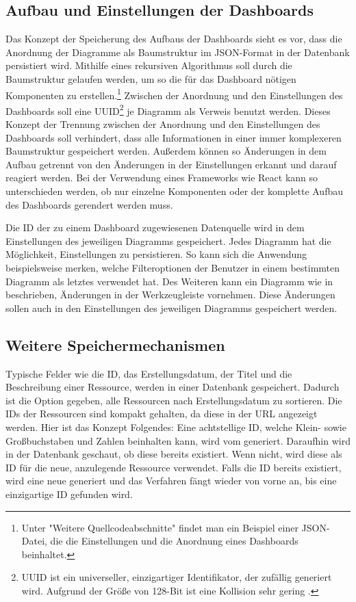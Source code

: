 \subsection{Aufbau und Einstellungen der Dashboards}
\label{subsec:aufbauundeinstellungenderdashboards}
Das Konzept der Speicherung des Aufbaus der Dashboards sieht es vor, dass die Anordnung 
der Diagramme als Baumstruktur im JSON-Format in der Datenbank persistiert wird. Mithilfe eines
rekursiven Algorithmus soll durch die Baumstruktur gelaufen werden, um so die für das Dashboard
nötigen Komponenten zu erstellen.\footnote{Unter "Weitere Quellcodeabschnitte" findet man ein Beispiel
einer JSON-Datei, die die Einstellungen und die Anordnung eines Dashboards beinhaltet.}
Zwischen der Anordnung und den Einstellungen des Dashboards soll eine UUID\footnote{UUID ist ein universeller,
einzigartiger Identifikator, der zufällig generiert wird. Aufgrund der Größe
von 128-Bit ist eine Kollision sehr gering \cite{UUIDJavaSEDocs}.} 
je Diagramm als Verweis benutzt werden. Dieses Konzept der Trennung zwischen
der Anordnung und den Einstellungen des Dashboards soll verhindert, dass
alle Informationen in einer immer komplexeren Baumstruktur gespeichert werden.
Außerdem können so Änderungen in dem Aufbau getrennt von den Änderungen in der
Einstellungen erkannt und darauf reagiert werden. Bei der Verwendung eines
Frameworks wie React kann so unterschieden werden, ob nur einzelne Komponenten
oder der komplette Aufbau des Dashboards gerendert werden muss.

Die ID der zu einem Dashboard zugewiesenen Datenquelle wird in dem Einstellungen
des jeweiligen Diagramms gespeichert. Jedes Diagramm hat die Möglichkeit,
Einstellungen zu persistieren. So kann sich die Anwendung beispielsweise merken,
welche Filteroptionen der Benutzer in einem bestimmten Diagramm als letztes verwendet
hat. Des Weiteren kann ein Diagramm wie in  beschrieben,
Änderungen in der Werkzeugleiste vornehmen. Diese Änderungen
sollen auch in den Einstellungen des jeweiligen Diagramms gespeichert werden.

\subsection{Weitere Speichermechanismen}
\label{subsec:weiterespeichermechanismen}
Typische Felder wie die ID, das Erstellungsdatum, der Titel und die Beschreibung einer Ressource,
werden in einer Datenbank gespeichert. Dadurch ist die Option gegeben, alle
Ressourcen nach Erstellungsdatum zu sortieren. Die IDs der Ressourcen sind kompakt gehalten,
da diese in der URL angezeigt werden. Hier ist das Konzept Folgendes: Eine achtstellige ID,
welche Klein- sowie Großbuchstaben und Zahlen beinhalten kann, wird vom 
generiert. Daraufhin wird in der Datenbank geschaut, ob diese bereits existiert. Wenn nicht,
wird diese als ID für die neue, anzulegende Ressource verwendet. Falls die ID bereits existiert,
wird eine neue generiert und das Verfahren fängt wieder von vorne an, bis eine einzigartige ID gefunden wird.

